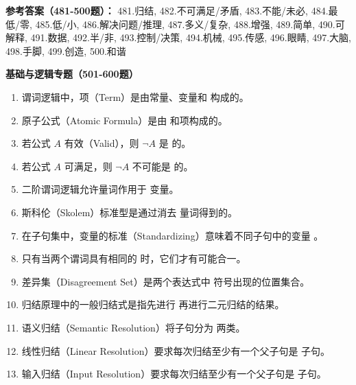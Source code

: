 \textbf{参考答案（481-500题）：}
481.归结, 482.不可满足/矛盾, 483.不能/未必, 484.最低/零, 485.低/小, 486.解决问题/推理, 487.多义/复杂, 488.增强, 489.简单, 490.可解释, 491.数据, 492.半/非, 493.控制/决策, 494.机械, 495.传感, 496.眼睛, 497.大脑, 498.手脚, 499.创造, 500.和谐

\vspace{1em}
\textbf{基础与逻辑专题（501-600题）}
\begin{enumerate}[resume,leftmargin=2em,itemsep=1pt]
\item 谓词逻辑中，项（Term）是由常量、变量和 \underline{\hspace{3em}} 构成的。
\item 原子公式（Atomic Formula）是由 \underline{\hspace{3em}} 和项构成的。
\item 若公式 $A$ 有效（Valid），则 $\neg A$ 是 \underline{\hspace{3em}} 的。
\item 若公式 $A$ 可满足，则 $\neg A$ 不可能是 \underline{\hspace{3em}} 的。
\item 二阶谓词逻辑允许量词作用于 \underline{\hspace{3em}} 变量。
\item 斯科伦（Skolem）标准型是通过消去 \underline{\hspace{3em}} 量词得到的。
\item 在子句集中，变量的标准（Standardizing）意味着不同子句中的变量 \underline{\hspace{3em}}。
\item 只有当两个谓词具有相同的 \underline{\hspace{3em}} 时，它们才有可能合一。
\item 差异集（Disagreement Set）是两个表达式中 \underline{\hspace{3em}} 符号出现的位置集合。
\item 归结原理中的一般归结式是指先进行 \underline{\hspace{3em}} 再进行二元归结的结果。
\item 语义归结（Semantic Resolution）将子句分为 \underline{\hspace{3em}} 两类。
\item 线性归结（Linear Resolution）要求每次归结至少有一个父子句是 \underline{\hspace{3em}} 子句。
\item 输入归结（Input Resolution）要求每次归结至少有一个父子句是 \underline{\hspace{3em}} 子句。

\end{enumerate}
